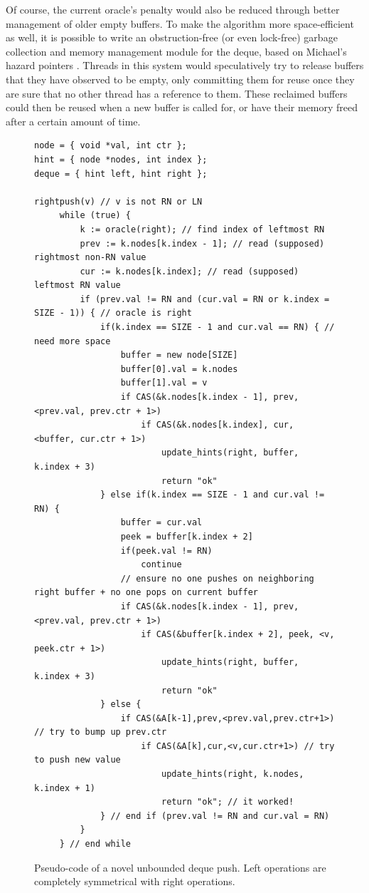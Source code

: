\documentclass[11pt, letterpaper]{article}
\begin{document}
        Of course, the current oracle's penalty would also be reduced through better management of older empty buffers. To make the algorithm more space-efficient as well, it is possible to write an obstruction-free (or even lock-free) garbage collection and memory management module for the deque, based on Michael's hazard pointers \cite{hazard}. Threads in this system would speculatively try to release buffers that they have observed to be empty, only committing them for reuse once they are sure that no other thread has a reference to them. These reclaimed buffers could then be reused when a new buffer is called for, or have their memory freed after a certain amount of time.

    
    

    \newpage
        \begin{figure}[t!]
            \footnotesize\begin{verbatim}
node = { void *val, int ctr };
hint = { node *nodes, int index };
deque = { hint left, hint right };

rightpush(v) // v is not RN or LN
     while (true) {
         k := oracle(right); // find index of leftmost RN
         prev := k.nodes[k.index - 1]; // read (supposed) rightmost non-RN value
         cur := k.nodes[k.index]; // read (supposed) leftmost RN value
         if (prev.val != RN and (cur.val = RN or k.index = SIZE - 1)) { // oracle is right
             if(k.index == SIZE - 1 and cur.val == RN) { // need more space
                 buffer = new node[SIZE]
                 buffer[0].val = k.nodes
                 buffer[1].val = v
                 if CAS(&k.nodes[k.index - 1], prev, <prev.val, prev.ctr + 1>)
                     if CAS(&k.nodes[k.index], cur, <buffer, cur.ctr + 1>)
                         update_hints(right, buffer, k.index + 3)
                         return "ok"
             } else if(k.index == SIZE - 1 and cur.val != RN) {
                 buffer = cur.val
                 peek = buffer[k.index + 2]
                 if(peek.val != RN)
                     continue
                 // ensure no one pushes on neighboring right buffer + no one pops on current buffer
                 if CAS(&k.nodes[k.index - 1], prev, <prev.val, prev.ctr + 1>)
                     if CAS(&buffer[k.index + 2], peek, <v, peek.ctr + 1>)
                         update_hints(right, buffer, k.index + 3)
                         return "ok"
             } else {
                 if CAS(&A[k-1],prev,<prev.val,prev.ctr+1>) // try to bump up prev.ctr
                     if CAS(&A[k],cur,<v,cur.ctr+1>) // try to push new value
                         update_hints(right, k.nodes, k.index + 1)
                         return "ok"; // it worked!
             } // end if (prev.val != RN and cur.val = RN)
         }
     } // end while
            \end{verbatim}
            \caption{Pseudo-code of a novel unbounded deque push. Left operations are completely symmetrical with right operations.}
            \label{code::unbounded-push}
        \end{figure}
\end{document}
